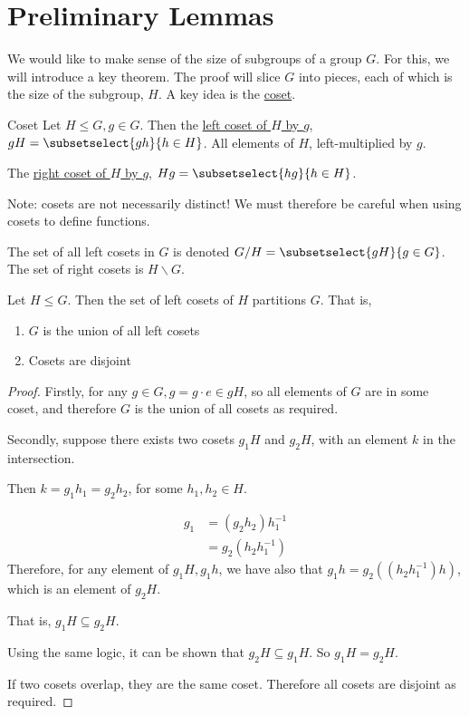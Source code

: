 \documentclass[../Main.tex]{subfiles}
\begin{document}
\section{Preliminary Lemmas}
We would like to make sense of the size of subgroups of a group $G$. For this, we will introduce a key theorem. The proof will slice $G$ into pieces, each of which is the size of the subgroup, $H$. A key idea is the \underline{coset}.
\begin{definition}{Coset}
    Let $H \leq G, g \in G$. Then the \underline{left coset of $H$ by $g$}, $gH = \subsetselect{gh}{h \in H}$. All elements of $H$, left-multiplied by $g$.\par
    The \underline{right coset of $H$ by $g$}, $Hg = \subsetselect{hg}{h \in H}$.
\end{definition}
Note: cosets are not necessarily distinct! We must therefore be careful when using cosets to define functions.\par
The set of all left cosets in $G$ is denoted $G / H = \subsetselect{gH}{g \in G}$. The set of right cosets is $H \backslash G$.
\begin{lemma}
    Let $H \leq G$. Then the set of left cosets of $H$ partitions $G$. That is,
    \begin{enumerate}
        \item $G$ is the union of all left cosets
        \item Cosets are disjoint
    \end{enumerate}
    \label{lemCosetsPartition}
\end{lemma}
\begin{proof}
    Firstly, for any $g \in G, g = g \cdot e \in gH$, so all elements of $G$ are in some coset, and therefore $G$ is the union of all cosets as required.\par
    Secondly, suppose there exists two cosets $g_1H$ and $g_2 H$, with an element $k$ in the intersection.\par
    Then $k = g_1 h_1 = g_2 h_2$, for some $h_1, h_2 \in H$.\par
    \begin{align*}
        g_1 &= (g_2 h_2) h_1^{-1} \\
        &= g_2 (h_2 h_1^{-1})
    \end{align*}
    Therefore, for any element of $g_1 H, g_1 h$, we have also that $g_1 h = g_2 ((h_2 h_1^{-1}) h)$, which is an element of $g_2 H$.\par
    That is, $g_1 H \subseteq g_2 H$.\par
    Using the same logic, it can be shown that $g_2 H \subseteq g_1 H$. So $g_1 H = g_2 H$.\par
    If two cosets overlap, they are the same coset. Therefore all cosets are disjoint as required.
\end{proof}
\end{document}
